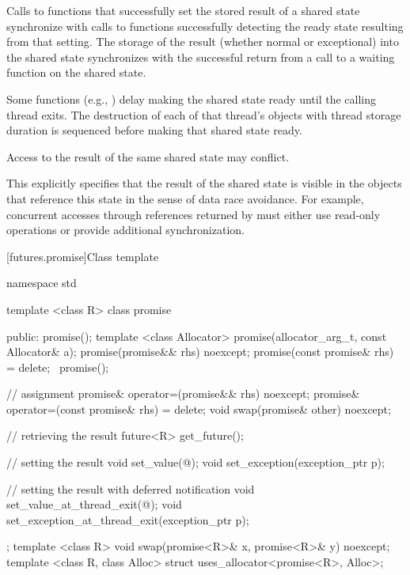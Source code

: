 \pnum
Calls to functions that successfully set the stored result of a shared
state synchronize
with calls to functions
successfully detecting the ready state resulting from that setting.
The storage of the result
(whether normal or exceptional) into the shared state
synchronizes with
the successful return from a call to a waiting function on the shared state.

\pnum
Some functions (e.g., ) delay making
the shared state ready until the calling thread exits. The destruction of
each of that thread's objects with thread storage duration
is sequenced before making that shared state ready.

\pnum
Access to the result of the same shared state may conflict.
\begin{note} This explicitly specifies that the result of the shared state is
visible in the objects that reference this state in the sense of data race
avoidance. For example, concurrent accesses through
references returned by 
must either use read-only operations or provide additional synchronization.
\end{note}

[futures.promise]{Class template }

%
\begin{codeblock}
namespace std {
  template <class R>
  class promise {
  public:
    promise();
    template <class Allocator>
      promise(allocator_arg_t, const Allocator& a);
    promise(promise&& rhs) noexcept;
    promise(const promise& rhs) = delete;
    ~promise();

    // assignment
    promise& operator=(promise&& rhs) noexcept;
    promise& operator=(const promise& rhs) = delete;
    void swap(promise& other) noexcept;

    // retrieving the result
    future<R> get_future();

    // setting the result
    void set_value(@\seebelow@);
    void set_exception(exception_ptr p);

    // setting the result with deferred notification
    void set_value_at_thread_exit(@\seebelow@);
    void set_exception_at_thread_exit(exception_ptr p);
  };
  template <class R>
    void swap(promise<R>& x, promise<R>& y) noexcept;
  template <class R, class Alloc>
    struct uses_allocator<promise<R>, Alloc>;
}
\end{codeblock}


